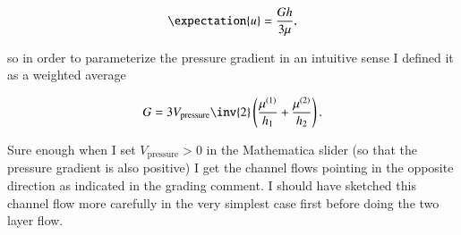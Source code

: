 \begin{equation}\label{eqn:continuumProblemSet2:940}
\expectation{u} = \frac{G h}{3 \mu},
\end{equation}

so in order to parameterize the pressure gradient in an intuitive sense I defined it as a weighted average

\begin{equation}\label{eqn:continuumProblemSet2:960}
G = 3 V_{\text{pressure}} \inv{2} \left( \frac{\mu^{(1)}}{h_1} + \frac{\mu^{(2)}}{h_2}\right).
\end{equation}

Sure enough when I set $V_{\text{pressure}} > 0$ in the Mathematica slider (so that the pressure gradient is also positive) I get the channel flows pointing in the opposite direction as indicated in the grading comment.  I should have sketched this channel flow more carefully in the very simplest case first before doing the two layer flow.

\EndNoBibArticle
